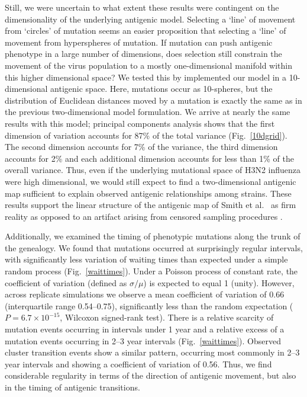 \documentclass[11pt,oneside,letterpaper]{article}
\begin{document}
Still, we were uncertain to what extent these results were contingent on the dimensionality of the underlying antigenic model.  Selecting a `line' of movement from `circles' of mutation seems an easier proposition that selecting a `line' of movement from hyperspheres of mutation.  If mutation can push antigenic phenotype in a large number of dimensions, does selection still constrain the movement of the virus population to a mostly one-dimensional manifold within this higher dimensional space?  We tested this by implemented our model in a 10-dimensional antigenic space.  Here, mutations occur as 10-spheres, but the distribution of Euclidean distances moved by a mutation is exactly the same as in the previous two-dimensional model formulation.  We arrive at nearly the same results with this model; principal components analysis shows that the first dimension of variation accounts for 87\% of the total variance (Fig.~\ref{10dgrid}).  The second dimension accounts for 7\% of the variance, the third dimension accounts for 2\% and each additional dimension accounts for less than 1\% of the overall variance.  Thus, even if the underlying mutational space of H3N2 influenza were high dimensional, we would still expect to find a two-dimensional antigenic map sufficient to explain observed antigenic relationships among strains.  These results support the linear structure of the antigenic map of Smith et al.\ \cite{Smith04} as firm reality as opposed to an artifact arising from censored sampling procedures \cite{Recker07}.

Additionally, we examined the timing of phenotypic mutations along the trunk of the genealogy.  We found that mutations occurred at surprisingly regular intervals, with significantly less variation of waiting times than expected under a simple random process (Fig.~\ref{waittimes}).  Under a Poisson process of constant rate, the coefficient of variation (defined as $\sigma / \mu$) is expected to equal 1 (unity).  However, across replicate simulations we observe a mean coefficient of variation of 0.66  (interquartile range 0.54--0.75), significantly less than the random expectation ($P = 6.7 \times 10^{-15}$, Wilcoxon signed-rank test).  There is a relative scarcity of mutation events occurring in intervals under 1 year and a relative excess of a mutation events occurring in 2--3 year intervals (Fig.~\ref{waittimes}).  Observed cluster transition events show a similar pattern, occurring most commonly in 2--3 year intervals and showing a coefficient of variation of 0.56.  Thus, we find considerable regularity in terms of the direction of antigenic movement, but also in the timing of antigenic transitions.  
\end{document}
